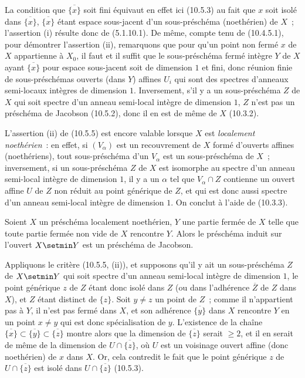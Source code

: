 La condition que $\overline{\{x\}}$ soit fini équivaut en effet ici (10.5.3)
au fait que $x$ soit isolé dans $\overline{\{x\}}$, $\overline{\{x\}}$ étant
espace sous-jacent d'un sous-préschéma (noethérien) de $X$~; l'assertion (i)
résulte donc de (5.1.10.1). De même, compte tenu de (10.4.5.1), pour démontrer
l'assertion (ii), remarquons que pour qu'un point non fermé $x$ de $X$
appartienne à $X_0$, il faut et il suffit que le sous-préschéma fermé intègre
$Y$ de $X$ ayant $\overline{\{x\}}$ pour espace sous-jacent soit de dimension
$1$ et fini, donc réunion finie de sous-préschémas ouverts (dans $Y$) affines
$U_i$ qui sont des spectres d'anneaux semi-locaux intègres de dimension $1$.
Inversement, s'il y a un sous-préschéma $Z$ de $X$ qui soit spectre d'un anneau
semi-local intègre de dimension $1$, $Z$ n'est pas un préschéma de Jacobson
(10.5.2), donc il en est de même de $X$ (10.3.2).

\begin{remark}[10.5.6]
\label{IV.10.5.6-fr}
L'assertion (ii) de (10.5.5) est encore valable lorsque $X$ est
\emph{localement noethérien}~: en effet, si $(V_\alpha)$ est un recouvrement de
$X$ formé d'ouverts affines (noethériens), tout sous-préschéma d'un $V_\alpha$
est un sous-préschéma de $X$~; inversement, si un sous-préschéma $Z$ de $X$ est
isomorphe au spectre d'un anneau semi-local intègre de dimension $1$, il y a
un $\alpha$ tel que $V_\alpha\cap Z$ contienne un ouvert affine $U$ de $Z$ non
réduit au point générique de $Z$, et qui est donc aussi spectre d'un anneau
semi-local intègre de dimension $1$. On conclut à l'aide de (10.3.3).
\end{remark}

\begin{proposition}[10.5.7]
\label{IV.10.5.7-fr}
Soient $X$ un préschéma localement noethérien, $Y$ une partie fermée de $X$
telle que toute partie fermée non vide de $X$ rencontre $Y$. Alors le
préschéma induit sur l'ouvert $X\setmin Y$ est un préschéma de Jacobson.
\end{proposition}

Appliquons le critère (10.5.5, (ii)), et supposons qu'il y ait un
sous-préschéma $Z$ de $X\setmin Y$ qui soit spectre d'un anneau semi-local intègre de
dimension $1$, le point générique $z$ de $Z$ étant donc isolé dans $Z$ (ou
dans l'adhérence $\overline Z$ de $Z$ dans $X$), et $Z$ étant distinct de
$\{z\}$. Soit $y\neq z$ un point de $Z$~; comme il n'appartient pas à $Y$, il
n'est pas fermé dans $X$, et son adhérence $\overline{\{y\}}$ dans $X$
rencontre $Y$ en un point $x\neq y$ qui est donc spécialisation de $y$.
L'existence de la chaîne
$\overline{\{x\}}\subset\overline{\{y\}}\subset\overline{\{z\}}$ montre alors que la
dimension de $\overline{\{z\}}$ serait $\geq2$, et il en serait de même de la
dimension de $U\cap\overline{\{z\}}$, où $U$ est un voisinage ouvert affine
(donc noethérien) de $x$ dans $X$. Or, cela contredit le fait que le point
générique $z$ de $U\cap\overline{\{z\}}$ est isolé dans
$U\cap\overline{\{z\}}$ (10.5.3).

